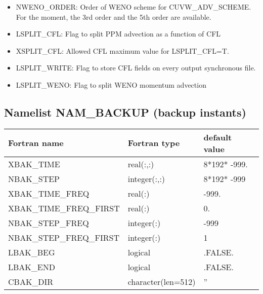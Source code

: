 \begin{itemize}
\item
{}
NWENO\_ORDER: Order of WENO scheme for CUVW\_ADV\_SCHEME. For the moment, 
the 3rd order and the 5th order are available.

\item
{}
LSPLIT\_CFL: Flag to split PPM advection as a function of CFL

\item
{}
XSPLIT\_CFL: Allowed CFL maximum value for LSPLIT\_CFL=T.  

\item
{}
LSPLIT\_WRITE: Flag to store CFL fields on every output synchronous file.

\item
{}
LSPLIT\_WENO: Flag to split WENO momentum advection


\end{itemize}

\subsection{Namelist NAM\_BACKUP (backup instants)}\label{s:nambackup}

\begin{center}
\begin{tabular} {|l|l|l|}
\hline
Fortran name & Fortran type & default value \\
\hline
XBAK\_TIME              & real(:,:)          & 8*192* -999. \\
NBAK\_STEP              & integer(:,:)       & 8*192* -999  \\
XBAK\_TIME\_FREQ        & real(:)            & -999.        \\
XBAK\_TIME\_FREQ\_FIRST & real(:)            & 0.           \\
NBAK\_STEP\_FREQ        & integer(:)         & -999         \\
NBAK\_STEP\_FREQ\_FIRST & integer(:)         & 1            \\
LBAK\_BEG               & logical            & .FALSE.      \\
LBAK\_END               & logical            & .FALSE.      \\
CBAK\_DIR               & character(len=512) & ''           \\
\hline
\end{tabular}
\end{center}

